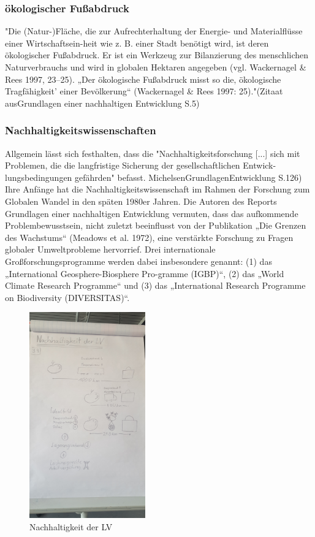 \documentclass{article}
\begin{document}
\subsubsection{ökologischer Fußabdruck}
"Die (Natur-)Fläche, die zur Aufrechterhaltung der Energie- und Materialflüsse einer Wirtschaftsein-heit wie z. B. einer Stadt benötigt wird, ist deren ökologischer Fußabdruck. Er ist ein Werkzeug zur Bilanzierung des menschlichen Naturverbrauchs und wird in globalen Hektaren angegeben (vgl. Wackernagel & Rees 1997, 23–25). „Der ökologische Fußabdruck misst so die‚ ökologische Tragfähigkeit’ einer Bevölkerung“ (Wackernagel & Rees 1997: 25)."(Zitaat ausGrundlagen einer nachhaltigen Entwicklung S.5)

\subsubsection{Nachhaltigkeitswissenschaften}
Allgemein lässt sich festhalten, dass die "Nachhaltigkeitsforschung [...] sich mit Problemen, die die langfristige Sicherung der gesellschaftlichen Entwick-lungsbedingungen gefährden" befasst. MichelsenGrundlagenEntwicklung \cite{Grundlagen einer nachhaltigen Entwicklung} S.126)
Ihre Anfänge hat die Nachhaltigkeitswissenschaft im Rahmen der Forschung zum Globalen Wandel in den späten 1980er Jahren. Die Autoren des Reports Grundlagen einer nachhaltigen Entwicklung vermuten, dass das aufkommende Problembewusstsein, nicht zuletzt beeinflusst von der Publikation „Die Grenzen des Wachstums“ (Meadows et al. 1972), eine verstärkte Forschung zu Fragen globaler Umweltprobleme hervorrief.
Drei internationale Großforschungsprogramme werden dabei insbesondere genannt: (1) das „International Geosphere-Biosphere Pro-gramme (IGBP)“, (2) das „World Climate Research Programme“ und (3) das
„International Research Programme on Biodiversity (DIVERSITAS)“.


\begin{figure}[htp]
\centering
\includegraphics[width=5cm]{image_folder/skizze1.jpg}
\caption{Nachhaltigkeit der LV}
\label{fig:Skizze_Nachhaltigkeit}
\end{figure}
\end{document}
